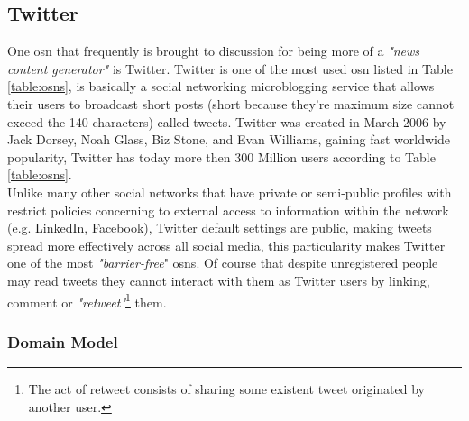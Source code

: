 \subsection{Twitter}
One \gls{osn} that frequently is brought to discussion for being more of a \textit{"news content generator"} is Twitter. Twitter is one of the most used \gls{osn} listed in Table \ref{table:osns}, is basically a social networking microblogging service that allows their users to broadcast short posts (short because they're maximum size cannot exceed the 140 characters) called tweets.
Twitter was created in March 2006 by Jack Dorsey, Noah Glass, Biz Stone, and Evan Williams, gaining fast worldwide popularity, Twitter has today more then 300 Million users according to Table \ref{table:osns}.\\

\indent Unlike many other social networks that have private or semi-public profiles with restrict policies concerning to external access to information within the network (e.g. LinkedIn, Facebook), Twitter default settings are public, making tweets spread more effectively across all social media, this particularity makes Twitter one of the most \textit{"barrier-free}" \glspl{osn}. Of course that despite unregistered people may read tweets
they cannot interact with them as Twitter users by linking, comment or \textit{"retweet"}\footnote{The act of retweet consists of sharing some existent tweet originated by another user.} them.

\clearpage

\subsubsection*{Domain Model}

